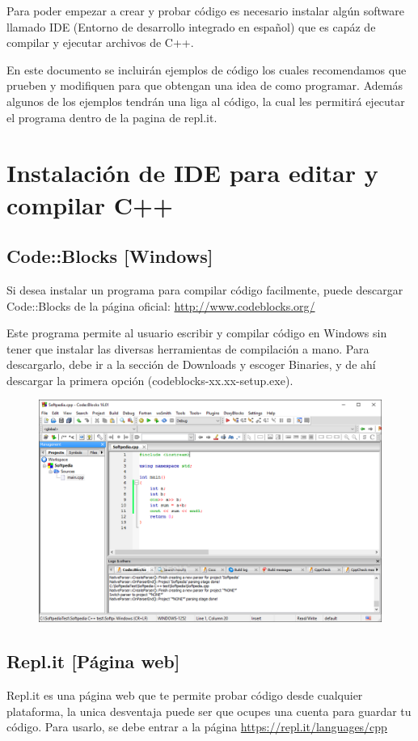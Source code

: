 \documentclass{article}
\begin{document}
Para poder empezar a crear y probar código es necesario instalar algún software llamado IDE (Entorno de desarrollo integrado en español) que es capáz de compilar y ejecutar archivos de C++.

En este documento se incluirán ejemplos de código los cuales recomendamos que prueben y modifiquen para que obtengan una idea de como programar. Además algunos de los ejemplos tendrán una liga al código, la cual les permitirá ejecutar el programa dentro de la pagina de repl.it.

\section{Instalación de IDE para editar y compilar C++}

\subsection{Code::Blocks [Windows]}
Si desea instalar un programa para compilar código facilmente, puede descargar Code::Blocks de la página oficial: \url{http://www.codeblocks.org/}

Este programa permite al usuario escribir y compilar código en Windows sin tener que instalar las diversas herramientas de compilación a mano. Para descargarlo, debe ir a la sección de Downloads y escoger Binaries, y de ahí descargar la primera opción (codeblocks-xx.xx-setup.exe).

\begin{figure}[H]
    \centering
    \includegraphics[width=0.5\paperwidth]{CodeBlocks}
\end{figure}

\subsection{Repl.it [Página web]}
Repl.it es una página web que te permite probar código desde cualquier plataforma, la unica desventaja puede ser que ocupes una cuenta para guardar tu código. Para usarlo, se debe entrar a la página \url{https://repl.it/languages/cpp}
\end{document}
